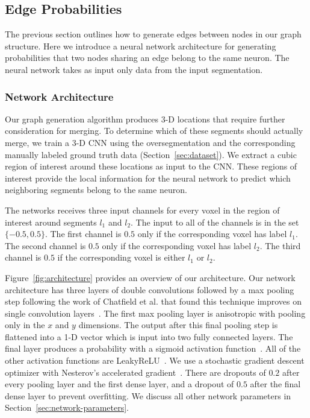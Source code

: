 \subsection{Edge Probabilities}

The previous section outlines how to generate edges between nodes in our graph structure.
Here we introduce a neural network architecture for generating probabilities that two nodes sharing an edge belong to the same neuron.
The neural network takes as input only data from the input segmentation.

\subsubsection{Network Architecture}

Our graph generation algorithm produces 3-D locations that require further consideration for merging.
To determine which of these segments should actually merge, we train a 3-D CNN using the oversegmentation and the corresponding manually labeled ground truth data (Section~\ref{sec:dataset}).
We extract a cubic region of interest around these locations as input to the CNN.
These regions of interest provide the local information for the neural network to predict which neighboring segments belong to the same neuron.

The networks receives three input channels for every voxel in the region of interest around segments $l_1$ and $l_2$.
The input to all of the channels is in the set $\{-0.5, 0.5\}$.
The first channel is $0.5$ only if the corresponding voxel has label $l_1$.
The second channel is $0.5$ only if the corresponding voxel has label $l_2$.
The third channel is $0.5$ if the corresponding voxel is either $l_1$ or $l_2$.

Figure~\ref{fig:architecture} provides an overview of our architecture.
Our network architecture has three layers of double convolutions followed by a max pooling step following the work of Chatfield et al. that found this technique improves on single convolution layers~\cite{chatfield2014return}. The first max pooling layer is anisotropic with pooling only in the $x$ and $y$ dimensions.
The output after this final pooling step is flattened into a 1-D vector which is input into two fully connected layers.
The final layer produces a probability with a sigmoid activation function~\cite{funahashi1989approximate}.
All of the other activation functions are LeakyReLU~\cite{maas2013rectifier}.
We use a stochastic gradient descent optimizer with Nesterov's accelerated gradient~\cite{nesterov1983method}.
There are dropouts of $0.2$ after every pooling layer and the first dense layer, and a dropout of $0.5$ after the final dense layer to prevent overfitting.
We discuss all other network parameters in Section~\ref{sec:network-parameters}.

